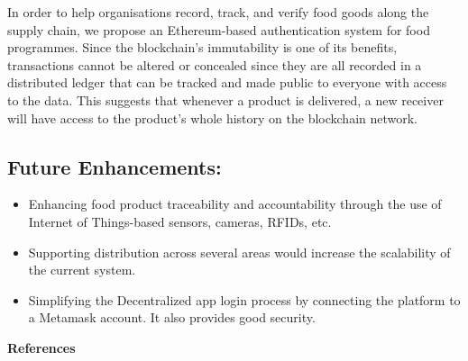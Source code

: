 \documentclass[12pt,a4paper,twocolumn,fleqn]{article}
\begin{document}
In order to help organisations record, track, and verify food goods along the supply chain, we propose an Ethereum-based authentication system for food programmes. Since the blockchain's immutability is one of its benefits, transactions cannot be altered or concealed since they are all recorded in a distributed ledger that can be tracked and made public to everyone with access to the data. This suggests that whenever a product is delivered, a new receiver will have access to the product's whole history on the blockchain network. \\
\subsection*{Future Enhancements:}
\begin{itemize}
    \item Enhancing food product traceability and accountability through the use of Internet of Things-based sensors, cameras, RFIDs, etc.
    \item Supporting distribution across several areas would increase the scalability of the current system.
    \item Simplifying the Decentralized app login process by connecting the platform to a Metamask account. It also provides good security.
\end{itemize}
\newpage
  \pagestyle{fancy}
  \fancyhf{}
  \chead{}
\renewcommand{\footrulewidth}{0.4pt}%
\normalsize
\LARGE{\textbf{References}} 
\normalsize
\let\lbrack[
\let\rbrack]
\end{document}
